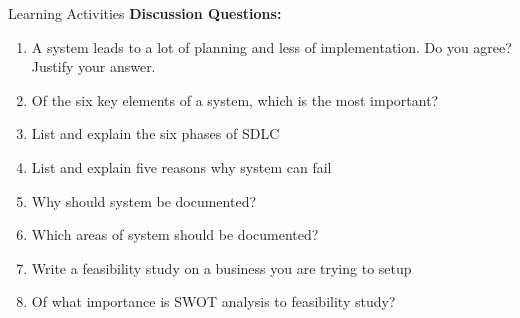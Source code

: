 \documentclass[aspectratio=169]{beamer}
\begin{document}
\begin{frame}{Learning Activities}
    \textbf{Discussion Questions:}
    
    \begin{enumerate}
        \item A system leads to a lot of planning and less of implementation. Do you agree? Justify your answer.
        
        \item Of the six key elements of a system, which is the most important?
        
        \item List and explain the six phases of SDLC
        
        \item List and explain five reasons why system can fail
        
        \item Why should system be documented?
        
        \item Which areas of system should be documented?
        
        \item Write a feasibility study on a business you are trying to setup
        
        \item Of what importance is SWOT analysis to feasibility study?
    \end{enumerate}
\end{frame}
\end{document}
